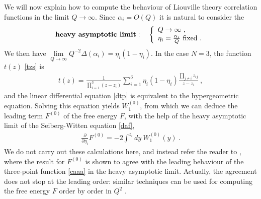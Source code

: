\documentclass[12pt, a4paper, notitlepage, twoside]{report}
\numberwithin{equation}{section}
\theoremstyle{break}
\begin{document}
We will now explain how to compute the behaviour of Liouville theory correlation functions in the limit $Q\to \infty$.
Since $\alpha_i=O(Q)$ it is natural to consider the 
\begin{align}
 \textbf{\boldmath heavy\ asymptotic\ limit}\index{heavy\ asymptotic\ limit}: \quad \left\{\begin{array}{l}  Q \to \infty \ ,\\ \eta_i=\frac{\alpha_i}{Q}\ \text{fixed}\ .\end{array}\right.  
\end{align}
We then have $\underset{Q\to\infty}{\lim} Q^{-2}\Delta(\alpha_i)=\eta_i(1-\eta_i)$.
In the case $N=3$, the function $t(z)$ \eqref{tzs} is 
\begin{align}
 t(z) = \frac{1}{\prod_{i=1}^3(z-z_i)} \sum_{i=1}^3 \eta_i(1-\eta_i)\frac{\prod_{j\neq i} z_{ij}}{z-z_i}\ ,
\end{align}
and the linear differential equation \eqref{dtp} is equivalent to the hypergeometric equation.
Solving this equation yields $W_1^{(0)}$, from which we can deduce the leading term $F^{(0)}$ of the free energy $F$, with the help of the heavy asymptotic limit of the Seiberg-Witten equation \eqref{daf}, 
\begin{align}
 {\frac{\partial}{\partial \eta_i}} F^{(0)} = -2\int^{z_i} dy\ W_1^{(0)}(y)\ .
\end{align}
We do not carry out these calculations here, and instead refer the reader to \cite{cer12}, where the result for $F^{(0)}$ is shown to agree with the leading behaviour of the three-point function \eqref{caaa} in the heavy asymptotic limit.
Actually, the agreement does not stop at the leading order: similar techniques can be used for computing the free energy $F$ order by order in $Q^2$ \cite{cer12}.
\end{document}
